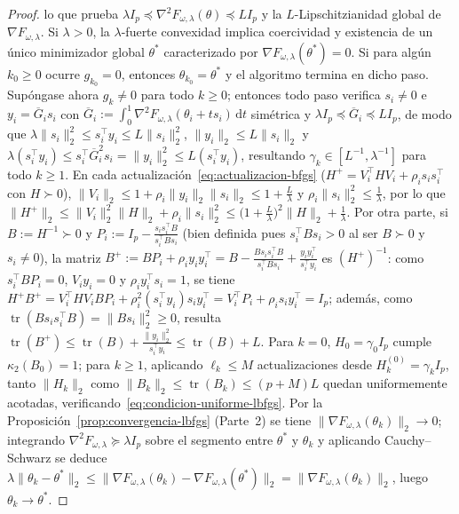 \documentclass[a4paper,openany,oneside,10pt]{report}
\theoremstyle{pnlTeorema}
\theoremstyle{pnlDefinicion}
\theoremstyle{pnlObservacion}
\DeclareMathOperator{\tr}{tr}
\newcommand{\dd}{\mathrm{d}}
\begin{document}
\begin{proof}
lo que prueba $\lambda I_p\preceq\nabla^2 F_{\omega,\lambda}(\theta)\preceq LI_p$ y la $L$-Lipschitzianidad global de $\nabla F_{\omega,\lambda}$. Si $\lambda>0$, la $\lambda$-fuerte convexidad implica coercividad y existencia de un único minimizador global $\theta^*$ caracterizado por $\nabla F_{\omega,\lambda}(\theta^*)=0$. Si para algún $k_0\ge 0$ ocurre $g_{k_0}=0$, entonces $\theta_{k_0}=\theta^*$ y el algoritmo termina en dicho paso. Supóngase ahora $g_k\neq 0$ para todo $k\ge 0$; entonces todo paso verifica $s_i\neq 0$ e $y_i=\overline{G}_i s_i$ con $\overline{G}_i:=\int_0^1\nabla^2 F_{\omega,\lambda}(\theta_i+ts_i)\,\dd t$ simétrica y $\lambda I_p\preceq\overline{G}_i\preceq LI_p$, de modo que $\lambda\|s_i\|_2^2\le s_i^\top y_i\le L\|s_i\|_2^2$, $\|y_i\|_2\le L\|s_i\|_2$ y $\lambda(s_i^\top y_i)\le s_i^\top\overline{G}_i^2 s_i=\|y_i\|_2^2\le L(s_i^\top y_i)$, resultando $\gamma_k\in[L^{-1},\lambda^{-1}]$ para todo $k\ge 1$. En cada actualización~\eqref{eq:actualizacion-bfgs} ($H^+=V_i^\top HV_i+\rho_i s_i s_i^\top$ con $H\succ 0$), $\|V_i\|_2\le 1+\rho_i\|y_i\|_2\|s_i\|_2\le 1+\frac{L}{\lambda}$ y $\rho_i\|s_i\|_2^2\le\frac1\lambda$, por lo que $\|H^+\|_2\le\|V_i\|_2^2\|H\|_2+\rho_i\|s_i\|_2^2\le\bigl(1+\frac{L}{\lambda}\bigr)^2\|H\|_2+\frac1\lambda$. Por otra parte, si $B:=H^{-1}\succ 0$ y $P_i:=I_p-\frac{s_i s_i^\top B}{s_i^\top Bs_i}$ (bien definida pues $s_i^\top Bs_i>0$ al ser $B\succ 0$ y $s_i\neq 0$), la matriz $B^+:=BP_i+\rho_i y_i y_i^\top=B-\frac{Bs_is_i^\top B}{s_i^\top Bs_i}+\frac{y_iy_i^\top}{s_i^\top y_i}$ es $(H^+)^{-1}$: como $s_i^\top BP_i=0$, $V_i y_i=0$ y $\rho_i y_i^\top s_i=1$, se tiene $H^+B^+=V_i^\top HV_i BP_i+\rho_i^2(s_i^\top y_i)s_i y_i^\top=V_i^\top P_i+\rho_i s_i y_i^\top=I_p$; además, como $\tr(Bs_i s_i^\top B)=\|Bs_i\|_2^2\ge 0$, resulta $\tr(B^+)\le\tr(B)+\frac{\|y_i\|_2^2}{s_i^\top y_i}\le\tr(B)+L$. Para $k=0$, $H_0=\gamma_0 I_p$ cumple $\kappa_2(B_0)=1$; para $k\ge 1$, aplicando $\ell_k\le M$ actualizaciones desde $H_k^{(0)}=\gamma_k I_p$, tanto $\|H_k\|_2$ como $\|B_k\|_2\le\tr(B_k)\le (p+M)L$ quedan uniformemente acotadas, verificando~\eqref{eq:condicion-uniforme-lbfgs}. Por la Proposición~\ref{prop:convergencia-lbfgs} (Parte~2) se tiene $\|\nabla F_{\omega,\lambda}(\theta_k)\|_2\to 0$; integrando $\nabla^2 F_{\omega,\lambda}\succeq\lambda I_p$ sobre el segmento entre $\theta^*$ y $\theta_k$ y aplicando Cauchy--Schwarz se deduce $\lambda\|\theta_k-\theta^*\|_2\le\|\nabla F_{\omega,\lambda}(\theta_k)-\nabla F_{\omega,\lambda}(\theta^*)\|_2=\|\nabla F_{\omega,\lambda}(\theta_k)\|_2$, luego $\theta_k\to\theta^*$.


\end{proof}
\end{document}
